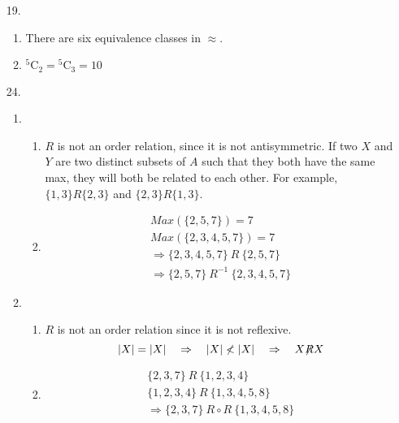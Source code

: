 \documentclass[fleqn]{article}
\begin{document}
\begin{enumerate}
\begin{enumerate}
{
		}
	\end{enumerate}

	\item[19.]
	\begin{enumerate}
		\item %
		There are six equivalence classes in \(\approx\).

		\item %
		\({^5}\text{C}_2 = {^5}\text{C}_3 = 10\)
	\end{enumerate}

	\item[24.]  
	\begin{enumerate}
		\item %
		\begin{enumerate}
			\item %
			\(R\) is not an order relation, since it is not antisymmetric. If two \(X\) and \(Y\) are two distinct subsets of \(A\) such that they both have the same max, they will both be related to each other. For example, \(\{1, 3\}R\{2, 3\}\) and \(\{2, 3\}R\{1, 3\}\).

			\item %
			\begin{gather*}
				Max(\{2, 5, 7\}) = 7 \\
				Max(\{2, 3, 4, 5, 7\}) = 7 \\
				\Rightarrow \{2, 3, 4, 5, 7\}\ R\ \{2, 5, 7\} \\
				\Rightarrow \{2, 5, 7\}\ R^{-1}\ \{2, 3, 4, 5, 7\}
			\end{gather*}
		\end{enumerate}

		\item %
		\begin{enumerate}
			\item %
			\(R\) is not an order relation since it is not reflexive.
			\[|X| = |X| \quad \Rightarrow \quad |X| \nless |X| \quad \Rightarrow \quad X{\centernot{R}}X\]

			\item %
			\begin{gather*}
				\{2, 3, 7\}\ R\ \{1, 2, 3, 4\} \\
				\{1, 2, 3, 4\}\ R\ \{1, 3, 4, 5, 8\} \\
				\Rightarrow \{2, 3, 7\}\ R \circ R\ \{1, 3, 4, 5, 8\} \\
			\end{gather*}
		\end{enumerate}
	\end{enumerate}
\end{enumerate}
	
\end{document}
